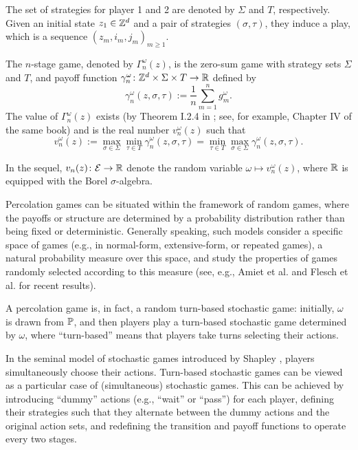 	The set of strategies for player 1 and 2 are denoted by $\Sigma$ and $T$, respectively. Given an  initial state $z_1 \in \mathbb{Z}^d$ and a pair of strategies $(\sigma, \tau)$, they induce a play, which is a sequence $(z_m, i_m, j_m)_{m\geq1}$.

	The $n$-stage game, denoted by $\Gamma_n^{\omega}(z)$, is the zero-sum game with strategy sets $\Sigma$ and $T$, and payoff function $\gamma_n^{\omega} \colon \mathbb{Z}^d \times \Sigma \times T \to \mathbb{R}$ defined by
	\[
		\gamma_n^{\omega}(z, \sigma, \tau) := \frac{1}{n}\sum_{m=1}^ng_m^{\omega}.
	\]
	The value of $\Gamma_n^{\omega}(z)$ exists (by Theorem I.2.4 in \cite{Mertens2015}; see, for example, Chapter IV of the same book) and is the real number $v_n^{\omega}(z)$ such that
	\[
		v_n^{\omega}(z) := \max_{\sigma \in \Sigma}\min_{\tau \in T} \gamma_n^{\omega}(z, \sigma, \tau) = \min_{\tau \in T}\max_{\sigma \in \Sigma} \gamma_n^{\omega}(z, \sigma, \tau).
	\]

	In the sequel, $v_n(z) \colon \mathcal{E} \to \mathbb{R}$ denote the random variable $\omega \mapsto v_n^{\omega}(z)$, where $\mathbb{R}$ is equipped with the Borel $\sigma$-algebra.
	
	Percolation games can be situated within the framework of random games, where the payoffs or structure are determined by a probability distribution rather than being fixed or deterministic. Generally speaking, such models consider a specific space of games (e.g., in normal-form, extensive-form, or repeated games), a natural probability measure over this space, and study the properties of games randomly selected according to this measure (see, e.g., Amiet et al. \cite{Amiet2021} and Flesch et al. \cite{Flesch2023} for recent results).

	A percolation game is, in fact, a random turn-based stochastic game: initially, $\omega$ is drawn from $\mathbb{P}$, and then players play a turn-based stochastic game determined by $\omega$, where ``turn-based'' means that players take turns selecting their actions.

	\begin{remark}
		In the seminal model of stochastic games introduced by Shapley \cite{Shapley1953}, players simultaneously choose their actions. Turn-based stochastic games can be viewed as a particular case of (simultaneous) stochastic games. This can be achieved by introducing ``dummy'' actions (e.g., ``wait'' or ``pass'') for each player, defining their strategies such that they alternate between the dummy actions and the original action sets, and redefining the transition and payoff functions to operate every two stages.
	\end{remark}

